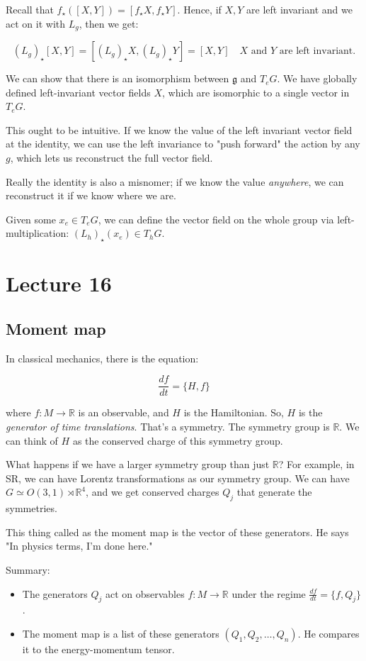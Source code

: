 \documentclass[11pt]{book}
\begin{document}
Recall that $f_\star([X, Y]) = [f_\star X, f_\star Y]$. Hence, if $X, Y$
are left invariant and we act on it with $L_g$, then we get:

$$
(L_g)_\star [X, Y] = [(L_g)_\star X, (L_g)_\star Y] = [X, Y] \quad \text{$X$ and $Y$ are left invariant.}
$$

We can show that there is an isomorphism between $\mathfrak g$ and $T_e G$. 
We have globally defined left-invariant vector fields $X$, which are isomorphic
to a single vector in $T_e G$.

This ought to be intuitive. If we know the value of the left invariant vector
field at the identity, we can use the left invariance to "push forward" the
action by any $g$, which lets us reconstruct the full vector field. 


Really the identity is also a misnomer; if we know the value \emph{anywhere},
we can reconstruct it if we know where we are.

Given some $x_e \in T_e G$, we can define the vector field on the whole group
via left-multiplication: $(L_h)_\star(x_e) \in T_h G$.


\chapter{Lecture 16}
\section{Moment map}

In classical mechanics, there is the equation:

$$
\frac{df}{dt} = \{ H, f \}
$$

where $f: M \rightarrow \mathbb R$ is an observable, and $H$ is the Hamiltonian.
So, $H$ is the \emph{generator of time translations}. That's a symmetry. The
symmetry group is $\mathbb R$. We can think of $H$ as the conserved charge
of this symmetry group.


What happens if we have a larger symmetry group than just $\mathbb R$? For example,
in SR, we can have Lorentz transformations as our symmetry group. We can
have $G \simeq O(3, 1) \rtimes \mathbb R^4$, and we get conserved charges 
$Q_j$ that generate the symmetries.

This thing called as the moment map is the vector of these generators. He says
"In physics terms, I'm done here."

Summary:
\begin{itemize}
\item The generators $Q_j$ act on observables $f: M \rightarrow \mathbb R$ under
  the regime $\frac{df}{dt} = \{f, Q_j\}$.
\item The moment map is a list of these generators $(Q_1, Q_2, \dots, Q_n)$.
     He compares it to the energy-momentum tensor.
\end{itemize}
\end{document}
